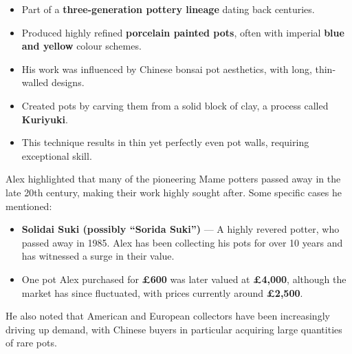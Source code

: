 \medskip

\noindent
\begin{itemize}
    \item Part of a \textbf{three\--generation pottery lineage} dating back centuries.
    
    \item Produced highly refined \textbf{porcelain painted pots}, often with imperial \textbf{blue and yellow} colour schemes.
    
    \item His work was influenced by Chinese bonsai pot aesthetics, with long, thin\--walled designs.
\end{itemize}

\medskip

\noindent
\begin{itemize}
    \item Created pots by carving them from a solid block of clay, a process called \textbf{Kuriyuki}.
    
    \item This technique results in thin yet perfectly even pot walls, requiring exceptional skill.
\end{itemize}

\medskip

\noindent
Alex highlighted that many of the pioneering Mame potters passed away in the late 20th century, making their work highly sought after.
Some specific cases he mentioned:

\begin{itemize}
    \item \textbf{Solidai Suki (possibly ``Sorida Suki'')} --- A highly revered potter, who passed away in 1985.
    Alex has been collecting his pots for over 10 years and has witnessed a surge in their value.

    \item One pot Alex purchased for \textbf{£600} was later valued at \textbf{£4,000}, although the market has since fluctuated, with prices currently around \textbf{£2,500}.
\end{itemize}

He also noted that American and European collectors have been increasingly driving up demand, with Chinese buyers in particular acquiring large quantities of rare pots.

\medskip

